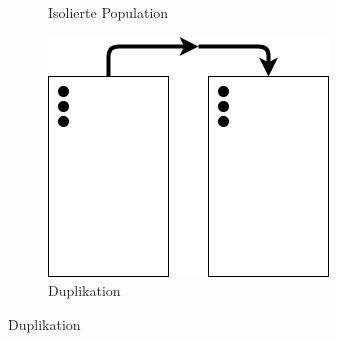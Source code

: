 \begin{figure}[!htb]
\begin{subfigure}{.3\textwidth}
	\caption{Isolierte Population}
	\label{fig:population_isoliert}
\end{subfigure}
\begin{subfigure}{.3\textwidth}
	\centering
	\includegraphics[width=.7\linewidth]{img/rechenberg_notation/duplikation.png}
	\caption{Duplikation}
	\label{fig:duplikation}
\end{subfigure}


\end{figure}
